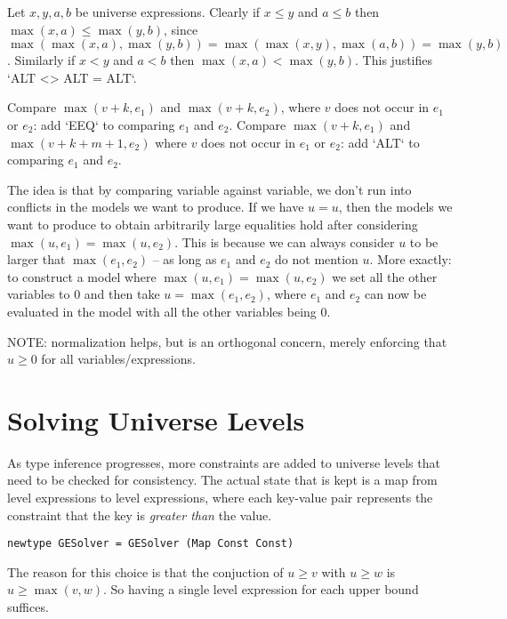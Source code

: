 \documentclass[11pt, twoside, reqno]{book}
\begin{document}
Let \(x, y, a, b\) be universe expressions.
Clearly if \(x \le y\) and \(a \le b\) then \(\max(x,a) \le \max(y,b)\), since \(\max(\max(x,a),\max(y,b)) = \max(\max(x,y),\max(a,b)) = \max(y,b)\).
Similarly if \(x < y\) and \(a < b\) then \(\max(x,a) < \max(y,b)\).
This justifies \inHS`ALT <> ALT = ALT`.

Compare \(\max(v+k, e_1)\) and \(\max(v+k, e_2)\), where \(v\) does not occur in \(e_1\) or \(e_2\): add \inHS`EEQ` to comparing \(e_1\) and \(e_2\).
Compare \(\max(v+k, e_1)\) and \(\max(v+k+m+1, e_2)\)  where \(v\) does not occur in \(e_1\) or \(e_2\): add \inHS`ALT` to comparing \(e_1\) and \(e_2\).


The idea is that by comparing variable against variable, we don't run into conflicts in the models we want to produce.
If we have \(u = u\), then the models we want to produce to obtain arbitrarily large equalities hold after considering \(\max(u, e_1) = \max(u, e_2)\).
This is because we can always consider \(u\) to be larger that \(\max(e_1, e_2)\) -- as long as \(e_1\) and \(e_2\) do not mention \(u\).
More exactly: to construct a model where \(\max(u, e_1) = \max(u, e_2)\) we set all the other variables to \(0\) and then take \(u = \max(e_1, e_2)\), where \(e_1\) and \(e_2\) can now be evaluated in the model with all the other variables being \(0\).

NOTE: normalization helps, but is an orthogonal concern, merely enforcing that \(u \ge 0\) for all variables/expressions.





\section{Solving Universe Levels}
\label{solv-uni-lvl}

As type inference progresses, more constraints are added to universe levels that need to be checked for consistency.
The actual state that is kept is a map from level expressions to level expressions, where each key-value pair represents the constraint that the key is \emph{greater than} the value.

\begin{verbatim}
newtype GESolver = GESolver (Map Const Const)
\end{verbatim}

The reason for this choice is that the conjuction of \(u \ge v\) with \(u \ge w\) is \(u \ge \max(v, w)\).
So having a single level expression for each upper bound suffices.
\end{document}

